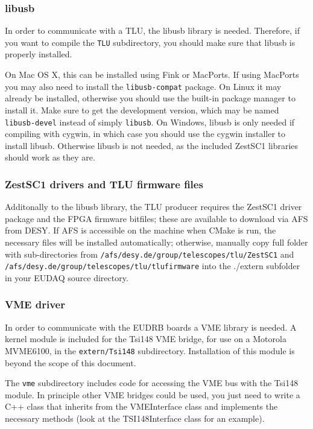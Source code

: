 \subsubsection{libusb}
In order to communicate with a \gls{TLU}, the libusb library is needed.
Therefore, if you want to compile the \texttt{TLU} subdirectory, you should make sure that libusb is properly installed.

On Mac OS X, this can be installed using Fink or MacPorts.
If using MacPorts you may also need to install the \texttt{libusb-compat} package.
On Linux it may already be installed,
otherwise you should use the built-in package manager to install it.
Make sure to get the development version, which may be named \texttt{libusb-devel} instead of simply \texttt{libusb}.
On Windows, libusb is only needed if compiling with cygwin,
in which case you should use the cygwin installer to install libusb.
Otherwise libusb is not needed, as the included ZestSC1 libraries should work as they are.


\subsubsection{ZestSC1 drivers and TLU firmware files}
Additonally to the libusb library, the \gls{TLU} producer requires the
ZestSC1 driver package and the FPGA firmware bitfiles; these are
available to download via AFS from DESY. If AFS is accessible on the machine
when CMake is run, the necessary files will be installed
automatically; otherwise, manually copy full folder with
sub-directories from
\texttt{/afs/desy.de/group/telescopes/tlu/ZestSC1} and
\texttt{/afs/desy.de/group/telescopes/tlu/tlufirmware} into the
./extern subfolder in your EUDAQ source directory.


\subsubsection{VME driver}
In order to communicate with the \gls{EUDRB} boards a VME library is needed.
A kernel module is included for the Tsi148 VME bridge,
for use on a Motorola MVME6100, in the \texttt{extern/Tsi148} subdirectory.
Installation of this module is beyond the scope of this document.

The \texttt{vme} subdirectory includes code for accessing the VME bus with the Tsi148 module.
In principle other VME bridges could be used,
you just need to write a C++ class that inherits from the VMEInterface class
and implements the necessary methods (look at the TSI148Interface class for an example).

